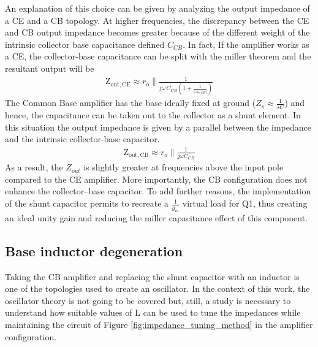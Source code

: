 An explanation of this choice can be given by analyzing the output impedance of a CE and a CB topology.
At higher frequencies, the discrepancy between the CE and CB output impedance becomes greater because of the different weight of the intrinsic collector base capacitance defined $C_{CB}$. In fact, If the amplifier works as a CE, the collector-base capacitance can be split with the miller theorem and the resultant output will be
\begin{align}
    \mathrm{Z}_\mathrm{out,CE}\approx r_o \parallel \frac{1}{j\omega\,C_{CB}\left(1+\frac{1}{|A_{v,CE}|}\right)}
\end{align}
The Common Base amplifier has the base ideally fixed at ground ($Z_s\approx \frac{1}{sC}$) and hence, the capacitance can be taken out to the collector as a shunt element. In this situation the output impedance is given by a parallel between the impedance and the intrinsic collector-base capacitor.
\begin{align}
    \mathrm{Z}_\mathrm{out,CB}\approx r_o \parallel \frac{1}{j\omega C_{CB}}
    \label{eq:ZoutCB}
\end{align}
As a result, the $Z_{out}$ is slightly greater at frequencies above the input pole compared to the CE amplifier. More importantly, the CB configuration does not enhance the collector–base capacitor.
To add further reasons, the implementation of the shunt capacitor permits to recreate a $\frac{1}{g_m}$ virtual load for Q1, thus creating an ideal unity gain and reducing the miller capacitance effect of this component.


\subsection{Base inductor degeneration}
 
Taking the CB amplifier and replacing the shunt capacitor with an inductor is one of the topologies used to create an oscillator. In the context of this work, the oscillator theory is not going to be covered but, still, a study is necessary to understand how suitable values of L can be used to tune the impedances while maintaining the circuit of Figure \ref{fig:impedance_tuning_method} in the amplifier configuration.

